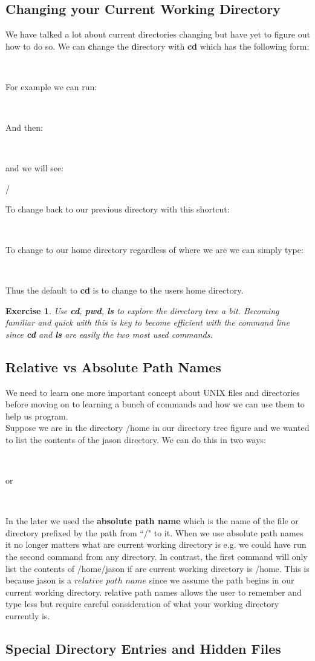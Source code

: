 \documentclass[oneside]{book}
\newcommand{\commandline}[1]{\begin{center} \colorbox{Dark}{\textcolor{white}{#1}} \end{center}}
\newcommand{\exampleout}[1]{\begin{center} \colorbox{Light}{\textcolor{black}{#1}} \end{center}}
\newtheorem{ex}{Exercise}[chapter]
\begin{document}
\subsection{Changing your Current Working Directory}
We have talked a lot about current directories changing but have yet to figure out how to do so. We can \textbf{c}hange the \textbf{d}irectory with \textbf{cd} which has the following form:
\commandline{cd dirToChangeTo}
For example we can run:
\commandline{cd /}
And then:
\commandline{pwd}
and we will see:
\exampleout{/}
To change back to our previous directory with this shortcut:
\commandline{cd -}
To change to our home directory regardless of where we are we can simply type:
\commandline{cd}
Thus the default to \textbf{cd} is to change to the users home directory. \\
\begin{ex}
	Use \textbf{cd}, \textbf{pwd}, \textbf{ls} to explore the directory tree a bit. Becoming familiar and quick with this is key to become efficient with the command line since \textbf{cd} and \textbf{ls} are easily the two most used commands.
\end{ex}

\subsection{Relative vs Absolute Path Names}
We need to learn one more important concept about UNIX files and directories before moving on to learning a bunch of commands and how we can use them to help us program. \\
Suppose we are in the directory /home in our directory tree figure and we wanted to list the contents of the jason directory. We can do this in two ways:
\commandline{ls jason}
or
\commandline{ls /home/jason}
In the later we used the \textbf{absolute path name} which is the name of the file or directory prefixed by the path from ``/" to it. When we use absolute path names it no longer matters what are current working directory is e.g. we could have run the second command from any directory. In contrast, the first command will only list the contents of /home/jason if are current working directory is /home. This is because jason is a $relative$ $path$ $name$ since we assume the path begins in our current working directory. relative path names allows the user to remember and type less but require careful consideration of what your working directory currently is. 

\subsection{Special Directory Entries and Hidden Files}
\end{document}
